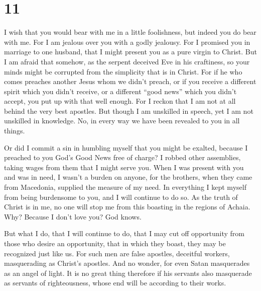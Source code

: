 \hypertarget{section-10}{%
\section{11}\label{section-10}}

 I wish that you would bear with me in a little foolishness,
but indeed you do bear with me.  For I am jealous over you
with a godly jealousy. For I promised you in marriage to one husband,
that I might present you as a pure virgin to Christ.  But I
am afraid that somehow, as the serpent deceived Eve in his craftiness,
so your minds might be corrupted from the simplicity that is in Christ.
 For if he who comes preaches another Jesus whom we didn't
preach, or if you receive a different spirit which you didn't receive,
or a different ``good news'' which you didn't accept, you put up with
that well enough.  For I reckon that I am not at all behind
the very best apostles.  But though I am unskilled in
speech, yet I am not unskilled in knowledge. No, in every way we have
been revealed to you in all things.

 Or did I commit a sin in humbling myself that you might be
exalted, because I preached to you God's Good News free of charge?
 I robbed other assemblies, taking wages from them that I
might serve you.  When I was present with you and was in
need, I wasn't a burden on anyone, for the brothers, when they came from
Macedonia, supplied the measure of my need. In everything I kept myself
from being burdensome to you, and I will continue to do so.
 As the truth of Christ is in me, no one will stop me from
this boasting in the regions of Achaia.  Why? Because I
don't love you? God knows.

 But what I do, that I will continue to do, that I may cut
off opportunity from those who desire an opportunity, that in which they
boast, they may be recognized just like us.  For such men
are false apostles, deceitful workers, masquerading as Christ's
apostles.  And no wonder, for even Satan masquerades as an
angel of light.  It is no great thing therefore if his
servants also masquerade as servants of righteousness, whose end will be
according to their works.

